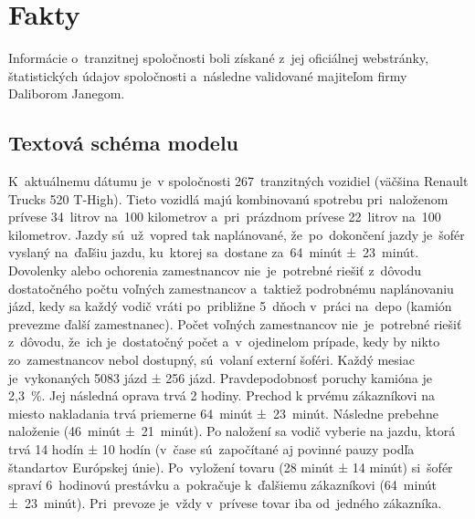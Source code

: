 \documentclass[a4paper, 11pt]{article}
\begin{document}
    \newpage
	\section{Fakty}
	Informácie o~tranzitnej spoločnosti boli získané z~jej oficiálnej
    webstránky, štatistických údajov spoločnosti a~následne validované
    majiteľom firmy Daliborom Janegom. 

    \subsection{Textová schéma modelu}
    K~aktuálnemu dátumu je~v spoločnosti
    267~tranzitných vozidiel (väčšina Renault Trucks
    520 T-High). Tieto vozidlá majú kombinovanú spotrebu pri~naloženom prívese
    34~litrov na~100 kilometrov a~pri~prázdnom prívese 22~litrov
    na~100 kilometrov.\newline
    Jazdy sú~už~vopred tak naplánované, že~po~dokončení jazdy je~šofér
    vyslaný na~ďaľšiu jazdu, ku~ktorej sa~dostane
    za~64~minút ±~23~minút.
    Dovolenky alebo ochorenia zamestnancov nie~je~potrebné riešiť
    z~dôvodu dostatočného počtu voľných zamestnancov a~taktiež
    podrobnému naplánovaniu jázd, kedy sa každý vodič vráti po~približne
    5~dňoch v~práci na~depo (kamión prevezme ďalší zamestnanec). Počet
    voľných zamestnancov nie~je~potrebné riešiť z~dôvodu, že~ich 
    je~dostatočný počet a~v~ojedinelom prípade, kedy by nikto zo~zamestnancov
    nebol dostupný, sú~volaní externí šoféri. Každý mesiac
    je~vykonaných 5083 jázd  ± 256 jázd. Pravdepodobnosť poruchy
    kamióna je 2,3~\%. Jej následná oprava trvá 2 hodiny.\newline
    Prechod k prvému zákazníkovi na miesto nakladania trvá priemerne 
    64~minút ±~23~minút. Následne prebehne naloženie (46~minút ±~21~minút).
    Po naložení sa vodič vyberie na jazdu, ktorá trvá 14 hodín ± 10 hodín
    (v~čase sú~započítané aj povinné pauzy podľa štandartov Európskej
    únie). 
    Po~vyložení tovaru (28 minút ± 14 minút) si~šofér spraví 6~hodinovú prestávku
    a~pokračuje k~ďalšiemu zákazníkovi (64~minút ±~23~minút). Pri~prevoze je~vždy v~prívese
    tovar iba od~jedného zákazníka.\newline
\end{document}
